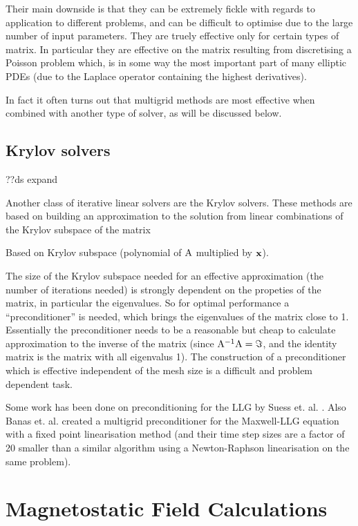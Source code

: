 Their main downside is that they can be extremely fickle with regards to application to different problems, and can be difficult to optimise due to the large number of input parameters.
They are truely effective only for certain types of matrix.
In particular they are effective on the matrix resulting from discretising a Poisson problem which, is in some way the most important part of many elliptic PDEs (due to the Laplace operator containing the highest derivatives).

In fact it often turns out that multigrid methods are most effective when combined with another type of solver, as will be discussed below.


\subsection{Krylov solvers}
\label{sec:krylov-solvers}

??ds expand

Another class of iterative linear solvers are the Krylov solvers.
These methods are based on building an approximation to the solution from linear combinations of the Krylov subspace of the matrix

Based on Krylov subspace (polynomial of $\mathrm{A}$ multiplied by $\mathbf{x}$).

The size of the Krylov subspace needed for an effective approximation (\ie the number of iterations needed) is strongly dependent on the propeties of the matrix, in particular the eigenvalues.
So for optimal performance a ``preconditioner'' is needed, which brings the eigenvalues of the matrix close to 1.
Essentially the preconditioner needs to be a reasonable but cheap to calculate approximation to the inverse of the matrix (since $\mathrm{A}^{-1}\mathrm{A} = \Im$, and the identity matrix is the matrix with all eigenvalus 1).
The construction of a preconditioner which is effective independent of the mesh size is a difficult and problem dependent task. 

Some work has been done on preconditioning for the LLG by Suess et. al. \cite{Suess2002}.
Also Banas et. al.\cite{Banas2008} \cite{Banas2010} created a multigrid preconditioner for the Maxwell-LLG equation with a fixed point linearisation method (and their time step sizes are a factor of 20 smaller than a similar algorithm using a Newton-Raphson linearisation on the same problem).


\section{Magnetostatic Field Calculations}
\label{sec:magn-field-calc}

